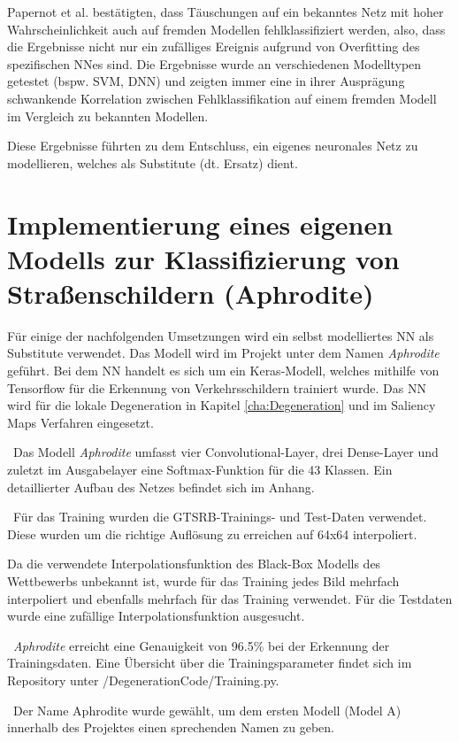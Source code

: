 Papernot et al.\cite{papernot_+_2016} bestätigten, dass Täuschungen auf ein bekanntes Netz mit hoher Wahrscheinlichkeit auch auf fremden Modellen fehlklassifiziert werden, also, dass die Ergebnisse nicht nur ein zufälliges Ereignis aufgrund von Overfitting des spezifischen \acl{NN}es sind. Die Ergebnisse wurde an verschiedenen Modelltypen getestet (bspw. \ac{SVM}, \ac{DNN}) und zeigten immer eine in ihrer Ausprägung schwankende Korrelation zwischen Fehlklassifikation auf einem fremden Modell im Vergleich zu bekannten Modellen. 


Diese Ergebnisse führten zu dem Entschluss, ein eigenes neuronales Netz zu modellieren, welches als Substitute (dt. Ersatz) dient.


\section{Implementierung eines eigenen Modells zur Klassifizierung von Straßenschildern (Aphrodite)}
Für einige der nachfolgenden Umsetzungen wird ein selbst modelliertes \ac{NN} als Substitute verwendet. Das Modell wird im Projekt unter dem Namen \textit{Aphrodite} geführt. Bei dem \ac{NN} handelt es sich um ein Keras-Modell, welches mithilfe von Tensorflow für die Erkennung von Verkehrsschildern trainiert wurde. Das \ac{NN} wird für die lokale Degeneration in Kapitel \ref{cha:Degeneration} und im Saliency Maps Verfahren eingesetzt.

~\newline Das Modell \textit{Aphrodite} umfasst vier Convolutional-Layer, drei Dense-Layer und zuletzt im Ausgabelayer eine Softmax-Funktion für die 43 Klassen. Ein detaillierter Aufbau des Netzes befindet sich im Anhang.

~\newline Für das Training wurden die \ac{GTSRB}-Trainings- und Test-Daten verwendet. Diese wurden um die richtige Auflösung zu erreichen auf 64x64 interpoliert. 

Da die verwendete Interpolationsfunktion des Black-Box Modells des Wettbewerbs unbekannt ist, wurde für das Training jedes Bild mehrfach interpoliert und ebenfalls mehrfach für das Training verwendet. Für die Testdaten wurde eine zufällige Interpolationsfunktion ausgesucht. 

~\newline \textit{Aphrodite} erreicht eine Genauigkeit von 96.5\% bei der Erkennung der Trainingsdaten. Eine Übersicht über die Trainingsparameter findet sich im Repository unter /DegenerationCode/Training.py. 

~\newline Der Name Aphrodite wurde gewählt, um dem ersten Modell (Model A) innerhalb des Projektes einen sprechenden Namen zu geben.
